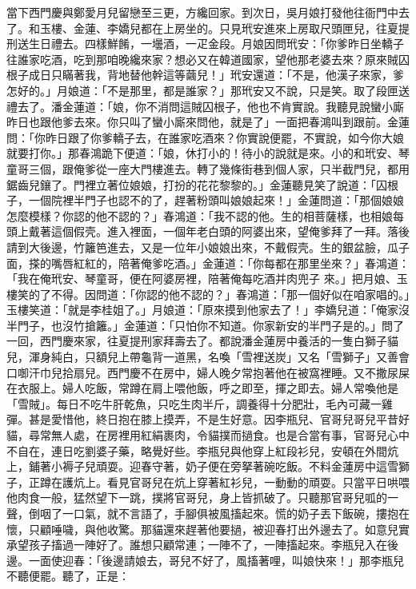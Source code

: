 \begin{showcontents}{}
當下西門慶與鄭愛月兒留戀至三更，方纔回家。到次日，吳月娘打發他往衙門中去了。和玉樓、金蓮、李嬌兒都在上房坐的。只見玳安進來上房取尺頭匣兒，往夏提刑送生日禮去。四樣鮮餚，一壜酒，一疋金段。月娘因問玳安：「你爹昨日坐轎子往誰家吃酒，吃到那咱晚纔來家？想必又在韓道國家，望他那老婆去來？原來賊囚根子成日只瞞著我，背地替他幹這等繭兒！」玳安還道：「不是，他漢子來家，爹怎好的。」月娘道：「不是那里，都是誰家？」那玳安又不說，只是笑。取了段匣送禮去了。潘金蓮道：「娘，你不消問這賊囚根子，他也不肯實說。我聽見說蠻小廝昨日也跟他爹去來。你只叫了蠻小廝來問他，就是了」一面把春鴻叫到跟前。金蓮問：「你昨日跟了你爹轎子去，在誰家吃酒來？你實說便罷，不實說，如今你大娘就要打你。」那春鴻跪下便道：「娘，休打小的！待小的說就是來。小的和玳安、琴童哥三個，跟俺爹從一座大門樓進去。轉了幾條街巷到個人家，只半截門兒，都用鋸齒兒鑲了。門裡立著位娘娘，打扮的花花黎黎的。」金蓮聽見笑了說道：「囚根子，一個院裡半門子也認不的了，趕著粉頭叫娘娘起來！」金蓮問道：「那個娘娘怎麼模樣？你認的他不認的？」春鴻道：「我不認的他。生的相菩薩樣，也相娘每頭上戴著這個假壳。進入裡面，一個年老白頭的阿婆出來，望俺爹拜了一拜。落後請到大後邊，竹籬笆進去，又是一位年小娘娘出來，不戴假壳。生的銀盆臉，瓜子面，搽的嘴唇紅紅的，陪著俺爹吃酒。」金蓮道：「你每都在那里坐來？」春鴻道：「我在俺玳安、琴童哥，便在阿婆房裡，陪著俺每吃酒并肉兜子 來。」把月娘、玉樓笑的了不得。因問道：「你認的他不認的？」春鴻道：「那一個好似在咱家唱的。」玉樓笑道：「就是李桂姐了。」月娘道：「原來摸到他家去了！」李嬌兒道：「俺家沒半門子，也沒竹搶籬。」金蓮道：「只怕你不知道。你家新安的半門子是的。」問了一回，西門慶來家，往夏提刑家拜壽去了。都說潘金蓮房中養活的一隻白獅子貓兒，渾身純白，只額兒上帶龜背一道黑，名喚「雪裡送炭」又名「雪獅子」又善會口啣汗巾兒拾扇兒。西門慶不在房中，婦人晚夕常抱著他在被窩裡睡。又不撒尿屎在衣服上。婦人吃飯，常蹲在肩上喂他飯，呼之即至，揮之即去。婦人常喚他是「雪賊」。每日不吃牛肝乾魚，只吃生肉半斤，調養得十分肥壯，毛內可藏一雞彈。甚是愛惜他，終日抱在膝上摸弄，不是生好意。因李瓶兒、官哥兒哥兒平昔好貓，尋常無人處，在房裡用紅絹裹肉，令貓撲而撾食。也是合當有事，官哥兒心中不自在，連日吃劉婆子藥，略覺好些。李瓶兒與他穿上紅段衫兒，安頓在外間炕上，鋪著小褥子兒頑耍。迎春守著，奶子便在旁拏著碗吃飯。不料金蓮房中這雪獅子，正蹲在護炕上。看見官哥兒在炕上穿著紅衫兒，一動動的頑耍。只當平日哄喂他肉食一般，猛然望下一跳，撲將官哥兒，身上皆抓破了。只聽那官哥兒呱的一聲，倒咽了一口氣，就不言語了，手腳俱被風搐起來。慌的奶子丟下飯碗，摟抱在懷，只顧唾噦，與他收驚。那貓還來趕著他要撾，被迎春打出外邊去了。如意兒實承望孩子搐過一陣好了。誰想只顧常連；一陣不了，一陣搐起來。李瓶兒入在後邊。一面使迎春：「後邊請娘去，哥兒不好了，風搐著哩，叫娘快來！」那李瓶兒不聽便罷。聽了，正是：


\end{showcontents}
